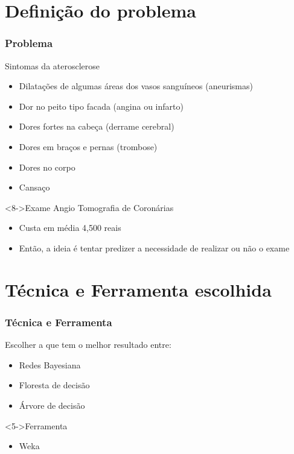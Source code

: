 \documentclass{beamer}
\theoremstyle{theorem}
\theoremstyle{definition}
\begin{document}
\section{Definição do problema}
\begin{frame}
\frametitle{Problema}
\begin{block}{Sintomas da aterosclerose}
	\begin{itemize}
		\item<2-> Dilatações de algumas áreas dos vasos sanguíneos (aneurismas)
		\item<3-> Dor no peito tipo facada (angina ou infarto)
		\item<4-> Dores fortes na cabeça (derrame cerebral)
		\item<5-> Dores em braços e pernas (trombose)
		\item<6-> Dores no corpo
		\item<7-> Cansaço
	\end{itemize}
\end{block}

\begin{block}<8->{Exame Angio Tomografia de Coronárias}
	\begin{itemize}
		\item<9-> Custa em média 4,500 reais 
		\item<10-> Então, a ideia é tentar predizer a necessidade de realizar ou não o exame
	\end{itemize}
\end{block}


\end{frame}





\section{Técnica e Ferramenta escolhida}
\begin{frame}
\frametitle{Técnica e Ferramenta}
\begin{block}{Escolher a que tem o melhor resultado entre:}
	\begin{itemize}
		\item<2-> Redes Bayesiana 
		\item<3-> Floresta de decisão
		\item<4-> Árvore de decisão
	\end{itemize}
\end{block}

\begin{block}<5->{Ferramenta}
\begin{itemize}
\item Weka
\end{itemize}
\end{block}

\end{frame}
\end{document}
